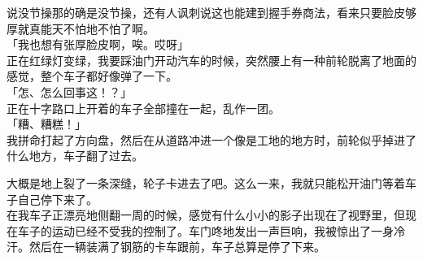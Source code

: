 说没节操那的确是没节操，还有人讽刺说这也能建到握手券商法，看来只要脸皮够厚就真能天不怕地不怕了啊。\\

「我也想有张厚脸皮啊，唉。哎呀」\\

正在红绿灯变绿，我要踩油门开动汽车的时候，突然腰上有一种前轮脱离了地面的感觉，整个车子都好像弹了一下。\\

「怎、怎么回事这！？」\\

正在十字路口上开着的车子全部撞在一起，乱作一团。\\

「糟、糟糕！」\\

我拼命打起了方向盘，然后在从道路冲进一个像是工地的地方时，前轮似乎掉进了什么地方，车子翻了过去。

大概是地上裂了一条深缝，轮子卡进去了吧。这么一来，我就只能松开油门等着车子自己停下来了。\\

在我车子正漂亮地侧翻一周的时候，感觉有什么小小的影子出现在了视野里，但现在车子的运动已经不受我的控制了。车门咚地发出一声巨响，我被惊出了一身冷汗。然后在一辆装满了钢筋的卡车跟前，车子总算是停了下来。\\

